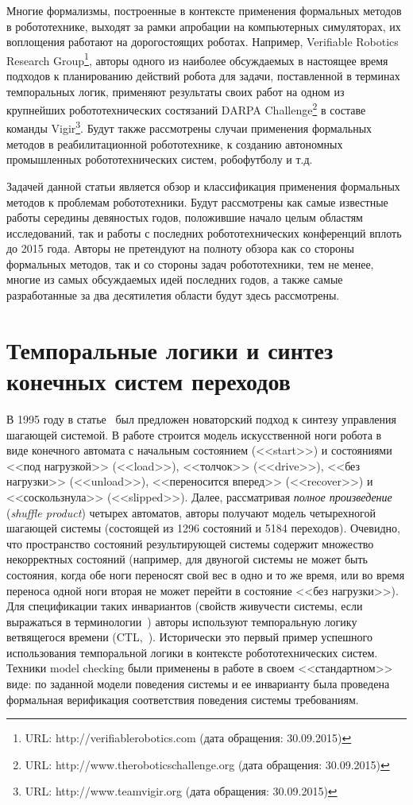\documentclass[conference]{IEEEtran}
\begin{document}
Многие формализмы, построенные в контексте применения формальных методов в 
робототехнике, выходят за рамки апробации на компьютерных симуляторах, их 
воплощения работают на дорогостоящих роботах. Например, Verifiable Robotics 
Research Group\footnote{URL: http://verifiablerobotics.com (дата обращения: 30.09.2015)}, 
авторы одного из наиболее обсуждаемых в настоящее время подходов 
к планированию действий робота для задачи, поставленной в терминах темпоральных 
логик, применяют результаты своих работ на одном из крупнейших робототехнических 
состязаний DARPA Challenge\footnote{URL: http://www.theroboticschallenge.org (дата обращения: 30.09.2015)}
 в составе команды Vigir\footnote{URL: http://www.teamvigir.org (дата обращения: 30.09.2015)}. 
Будут также рассмотрены случаи применения формальных методов в реабилитационной 
робототехнике, к созданию автономных промышленных робототехнических систем, 
робофутболу и т.д.

Задачей данной статьи является обзор и классификация применения формальных 
методов к проблемам робототехники. Будут рассмотрены как самые известные работы 
середины девяностых годов, положившие начало целым областям исследований, так и 
работы с последних робототехнических конференций вплоть до 2015 года. Авторы не 
претендуют на полноту обзора как со стороны формальных методов, так и со стороны 
задач робототехники, тем не менее, многие из самых обсуждаемых идей последних 
годов, а также самые разработанные за два десятилетия области будут здесь рассмотрены.

\section{Темпоральные логики и синтез конечных систем переходов}
\label{part:temporalLogics}
В 1995 году в статье~\cite{antoniotti1995discrete} был предложен новаторский 
подход к синтезу управления шагающей системой. В работе строится модель 
искусственной ноги робота в виде конечного автомата с начальным состоянием 
(<<start>>) и состояниями <<под нагрузкой>> (<<load>>), <<толчок>> (<<drive>>), 
<<без нагрузки>> (<<unload>>), <<переносится вперед>> (<<recover>>) и 
<<соскользнула>> (<<slipped>>). Далее, рассматривая \textit{полное произведение} 
(\textit{shuffle product}) четырех автоматов, авторы получают модель четырехногой шагающей 
системы (состоящей из 1296 состояний и 5184 переходов). Очевидно, что пространство 
состояний результирующей системы содержит множество некорректных состояний 
(например, для двуногой системы не может быть состояния, когда обе ноги переносят 
свой вес в одно и то же время, или во время переноса одной ноги вторая не может 
перейти в состояние <<без нагрузки>>). Для спецификации таких инвариантов 
(свойств живучести системы, если выражаться в терминологии~\cite{alpern1985defining}) 
авторы используют темпоральную логику ветвящегося времени (CTL,~\cite{clarke1986automatic}). 
Исторически это первый пример успешного использования темпоральной логики в 
контексте робототехнических систем. Техники model checking были применены в 
работе в своем <<стандартном>> виде: по заданной модели поведения системы и ее 
инварианту была проведена формальная верификация соответствия поведения системы 
требованиям.
\end{document}

